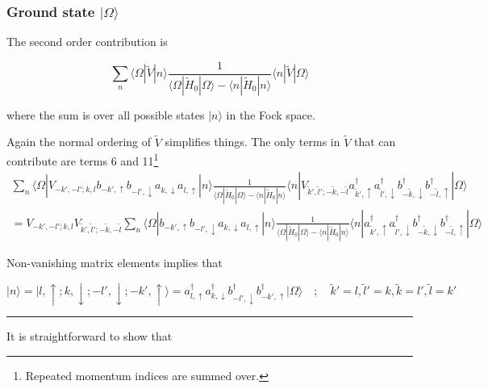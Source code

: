 \documentclass[
  letterpaper,
  DIV=11,
  numbers=noendperiod]{scrartcl}
\begin{document}
\subsubsection{\texorpdfstring{Ground state
\(|\Omega\rangle\)}{Ground state \textbar\textbackslash Omega\textbackslash rangle}}\label{sec-2ndOrderGroundState}

The second order contribution is

\begin{equation}
\sum_{n}\langle\Omega|\tilde V|n\rangle\frac{1}{\langle\Omega|\tilde H_0|\Omega\rangle-\langle n|\tilde H_0|n\rangle}\langle n|\tilde V|\Omega\rangle
\end{equation}

where the sum is over all possible states \(|n\rangle\) in the Fock
space.

Again the normal ordering of \(\tilde V\) simplifies things. The only
terms in \(\tilde V\) that can contribute are terms 6 and 11\footnote{Repeated
  momentum indices are summed over.}
\begin{multline}
\sum_{n}\langle\Omega|V_{-k',-l';k,l}b^{}_{-k',\uparrow}b^{}_{-l',\downarrow}a^{}_{k,\downarrow}a^{}_{l,\uparrow}|n\rangle\frac{1}{\langle\Omega|\tilde H_0|\Omega\rangle-\langle n|\tilde H_0|n\rangle}\langle n|V_{\tilde k',\tilde l';-\tilde k,-\tilde l}a^\dagger_{\tilde k',\uparrow}a^\dagger_{\tilde l',\downarrow}b^\dagger_{-\tilde k,\downarrow}b^\dagger_{-\tilde l,\uparrow}|\Omega\rangle\\
=
V_{-k',-l';k,l}V_{\tilde k',\tilde l';-\tilde k,-\tilde l}\sum_{n}\langle\Omega|b^{}_{-k',\uparrow}b^{}_{-l',\downarrow}a^{}_{k,\downarrow}a^{}_{l,\uparrow}|n\rangle\frac{1}{\langle\Omega|\tilde H_0|\Omega\rangle-\langle n|\tilde H_0|n\rangle}\langle n|a^\dagger_{\tilde k',\uparrow}a^\dagger_{\tilde l',\downarrow}b^\dagger_{-\tilde k,\downarrow}b^\dagger_{-\tilde l,\uparrow}|\Omega\rangle
\end{multline}

Non-vanishing matrix elements implies that

\[
|n\rangle=|l,\uparrow;k,\downarrow;-l',\downarrow;-k',\uparrow\rangle=a^{\dagger}_{l,\uparrow}a^{\dagger}_{k,\downarrow}b^{\dagger}_{-l',\downarrow}b^{\dagger}_{-k',\uparrow}|\Omega\rangle
\quad;\quad \tilde k'=l,\tilde l'=k,\tilde k=l',\tilde l=k'
\]

\begin{center}\rule{0.5\linewidth}{0.5pt}\end{center}

It is straightforward to show that
\end{document}
